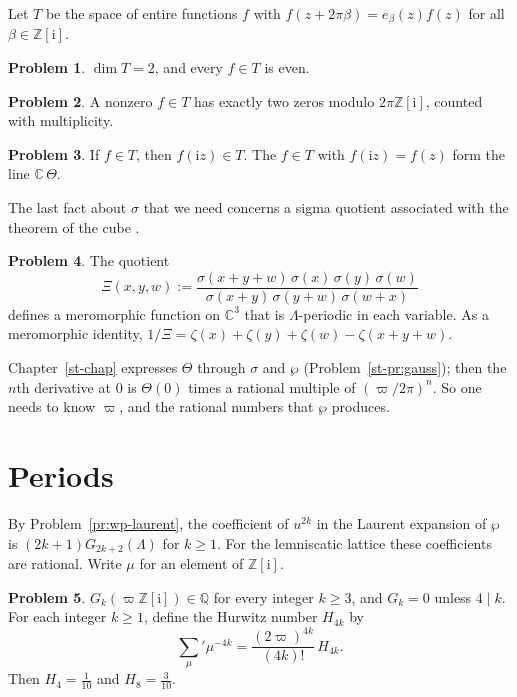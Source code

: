\documentclass[reqno]{amsart}
\newcounter{chap}
\theoremstyle{definition}
\newtheorem{problem}{Problem}[section]
\theoremstyle{plain}
\newcommand{\Z}{\mathbb{Z}}
\newcommand{\Q}{\mathbb{Q}}
\newcommand{\C}{\mathbb{C}}
\newcommand{\ii}{\mathrm{i}}
\begin{document}
Let \(T\) be the space of entire functions \(f\) with \(f(z + 2\pi\beta) = e_\beta(z) f(z)\) for all \(\beta \in \Z[\ii]\).

\begin{problem}\label{pr:T-dim}
\(\dim T = 2\), and every \(f \in T\) is even.
\end{problem}

\begin{problem}\label{pr:T-zeros}
A nonzero \(f\in T\) has exactly two zeros modulo \(2\pi\Z[\ii]\), counted with multiplicity.
\end{problem}

\begin{problem}\label{pr:T-fixed}
If \(f \in T\), then \(f(\ii z) \in T\).  The \(f \in T\) with \(f(\ii z) = f(z)\) form the line \(\C\,\Theta\).
\end{problem}

The last fact about \(\sigma\) that we need concerns a sigma quotient associated with the theorem of the cube \cite[\S6, \S10]{Mu}.

\begin{problem}\label{pr:cube}
The quotient
\[
  \Xi(x, y, w) := \frac{\sigma(x+y+w)\,\sigma(x)\,\sigma(y)\,\sigma(w)}{\sigma(x+y)\,\sigma(y+w)\,\sigma(w+x)}
\]
defines a meromorphic function on \(\C^3\) that is \(\Lambda\)-periodic in each variable.  As a meromorphic identity, \(1/\Xi = \zeta(x) + \zeta(y) + \zeta(w) - \zeta(x+y+w)\).
\end{problem}

Chapter~\ref{st-chap} expresses \(\Theta\) through \(\sigma\) and \(\wp\) (Problem~\ref{st-pr:gauss}); then the \(n\)th derivative at \(0\) is \(\Theta(0)\) times a rational multiple of \((\varpi/2\pi)^n\).  So one needs to know \(\varpi\), and the rational numbers that \(\wp\) produces.

\section{Periods}\label{sec:periods}

By Problem~\ref{pr:wp-laurent}, the coefficient of \(u^{2k}\) in the Laurent expansion of \(\wp\) is \((2k+1)G_{2k+2}(\Lambda)\) for \(k \ge 1\).  For the lemniscatic lattice these coefficients are rational.  Write \(\mu\) for an element of \(\Z[\ii]\).

\begin{problem}\label{pr:hurwitz}
\(G_k(\varpi\Z[\ii]) \in \Q\) for every integer \(k \ge 3\), and \(G_k = 0\) unless \(4 \mid k\).  For each integer \(k\ge1\), define the Hurwitz number \(H_{4k}\) by
\[
  \sum_{\mu}{}' \mu^{-4k} = \frac{(2\varpi)^{4k}}{(4k)!}\, H_{4k} .
\]
Then \(H_4 = \tfrac{1}{10}\) and \(H_8 = \tfrac{3}{10}\).
\end{problem}
\end{document}
